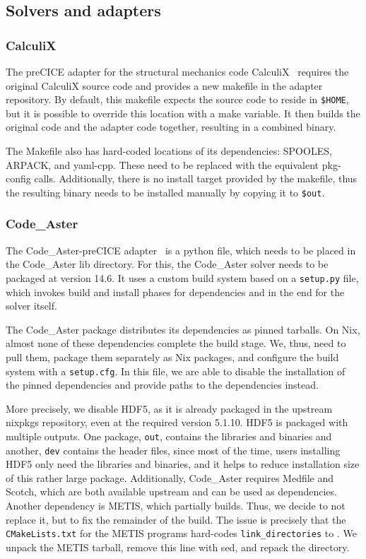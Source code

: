 \documentclass{eceasst}
\begin{document}
\subsection{Solvers and adapters}

\subsubsection{CalculiX}

The preCICE adapter for the structural mechanics code CalculiX~\cite{Uekermann2017_Adapters} requires the original CalculiX source code and provides a new makefile in the adapter repository.
By default, this makefile expects the source code to reside in \texttt{\$HOME}, but it is possible to override this location with a make variable.
It then builds the original code and the adapter code together, resulting in a combined binary.

The Makefile also has hard-coded locations of its dependencies: SPOOLES, ARPACK, and yaml-cpp. These need to be replaced with the equivalent pkg-config calls.
Additionally, there is no install target provided by the makefile, thus the resulting binary needs to be installed manually by copying it to \texttt{\$out}.

\subsubsection{Code\_Aster}

The Code\_Aster-preCICE adapter~\cite{Uekermann2017_Adapters} is a python file, which needs to be placed in the Code\_Aster lib directory.
For this, the Code\_Aster solver needs to be packaged at version 14.6.
It uses a custom build system based on a \texttt{setup.py} file, which invokes build and install phases for dependencies and in the end for the solver itself.

The Code\_Aster package distributes its dependencies as pinned tarballs.
On Nix, almost none of these dependencies complete the build stage. We, thus, need to pull them, package them separately as Nix packages, and configure the build system with a \texttt{setup.cfg}.
In this file, we are able to disable the installation of the pinned dependencies and provide paths to the dependencies instead.

More precisely, we disable HDF5, as it is already packaged in the upstream nixpkgs repository, even at the required version 5.1.10.
HDF5 is packaged with multiple outputs.
One package, \texttt{out}, contains the libraries and binaries and another, \texttt{dev} contains the header files, since most of the time, users installing HDF5 only need the libraries and binaries, and it helps to reduce installation size of this rather large package.
Additionally, Code\_Aster requires Medfile and Scotch, which are both available upstream and can be used as dependencies.
Another dependency is METIS, which partially builds. Thus, we decide to not replace it, but to fix the remainder of the build.
The issue is precisely that the \texttt{CMakeLists.txt} for the METIS programs hard-codes \texttt{link\_directories} to . We unpack the METIS tarball, remove this line with sed, and repack the directory.
\end{document}
